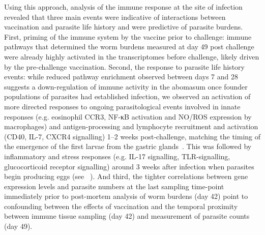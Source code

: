 \documentclass[a4paper, hidelinks, 11pt]{article}
\begin{document}
Using this approach, analysis of the immune response at the site of infection
revealed that three main events were indicative of interactions between
vaccination and parasite life history and were predictive of parasite burdens.
First, priming of the immune system by the vaccine prior to challenge: immune
pathways that determined the worm burdens measured at day 49 post challenge were
already highly activated in the transcriptomes before challenge, likely driven
by the pre-challenge vaccination. Second, the response to parasite life history
events: while reduced pathway enrichment observed between days 7 and 28 suggests
a down-regulation of immune activity in the abomasum once founder populations of
parasites had established infection, we observed an activation of more directed
responses to ongoing parasitological events involved in innate responses (e.g.
eosinophil CCR3, NF-κB activation and NO/ROS expression by macrophages) and
antigen-processing and lymphocyte recruitment and activation (CD40, IL-7, CXCR4
signalling) 1–2 weeks post-challenge, matching the timing of the emergence of
the first larvae from the gastric glands~\supercite{Simpson2000}.  This was
followed by inflammatory and stress responses (e.g. IL-17 signalling,
TLR-signalling, glucocorticoid receptor signalling) around 3 weeks after
infection when parasites begin producing eggs (see ~).
And third, the tighter correlations between gene expression levels and parasite
numbers at the last sampling time-point immediately prior to post-mortem
analysis of worm burdens (day 42) point to confounding between the effects of
vaccination and the temporal proximity between immune tissue sampling (day 42)
and measurement of parasite counts (day 49).
\end{document}
